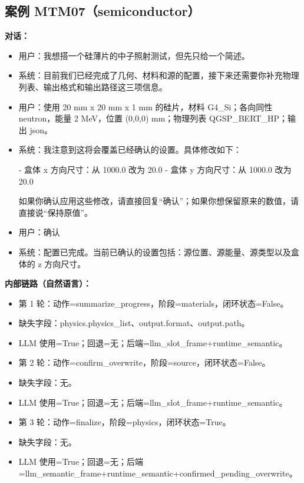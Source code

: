 \documentclass[11pt]{ctexart}
\begin{document}
\subsection{案例 MTM07（semiconductor）}
\textbf{对话：}
\begin{itemize}
\item 用户：我想搭一个硅薄片的中子照射测试，但先只给一个简述。
\item 系统：目前我们已经完成了几何、材料和源的配置，接下来还需要你补充物理列表、输出格式和输出路径这三项信息。
\item 用户：使用 20 mm x 20 mm x 1 mm 的硅片，材料 G4\_Si；各向同性 neutron，能量 2 MeV，位置 (0,0,0) mm；物理列表 QGSP\_BERT\_HP；输出 json。
\item 系统：我注意到这将会覆盖已经确认的设置。具体修改如下：

- 盒体 x 方向尺寸：从 1000.0 改为 20.0
- 盒体 y 方向尺寸：从 1000.0 改为 20.0

如果你确认应用这些修改，请直接回复“确认”；如果你想保留原来的数值，请直接说“保持原值”。
\item 用户：确认
\item 系统：配置已完成。当前已确认的设置包括：源位置、源能量、源类型以及盒体的 z 方向尺寸。
\end{itemize}
\textbf{内部链路（自然语言）：}
\begin{itemize}
\item 第 1 轮：动作=summarize\_progress，阶段=materials，闭环状态=False。
\item 缺失字段：physics.physics\_list、output.format、output.path。
\item LLM 使用=True；回退=无；后端=llm\_slot\_frame+runtime\_semantic。
\item 第 2 轮：动作=confirm\_overwrite，阶段=source，闭环状态=False。
\item 缺失字段：无。
\item LLM 使用=True；回退=无；后端=llm\_slot\_frame+runtime\_semantic。
\item 第 3 轮：动作=finalize，阶段=physics，闭环状态=True。
\item 缺失字段：无。
\item LLM 使用=True；回退=无；后端=llm\_semantic\_frame+runtime\_semantic+confirmed\_pending\_overwrite。
\end{itemize}
\end{document}
